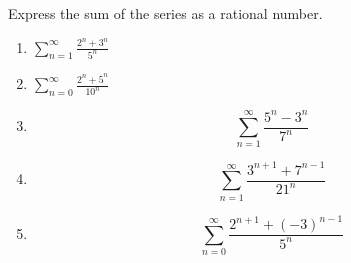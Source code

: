 Express the sum of the series as a rational number.
\begin{multicols}{2}
\begin{enumerate}[ref={\fcProblemRef}]
\item 
\label{problemSum(2^n+3^n)/(5^n)}
$
\displaystyle \sum\limits_{n=1}^{\infty} \frac{2^n+3^n}{5^n}
$


\item \label{problemsumn=0^infty(2^n+5^n)/10^n}
$\displaystyle\sum_{n=0}^{\infty} \frac{2^n+5^n}{10^n}$

\item \label{problemSum(3^n+5^n)/(7^n)}
\[
\sum\limits_{n=1}^{\infty} \frac{5^n-3^n}{7^n}
\]

\item \label{sum_n=1^infty(3^(n+1)+7^(n-1))/21^n}
\[
\sum_{n=1}^\infty \frac{3^{n+1}+7^{n-1}}{21^n}
\]
\item \label{sum_n=0^infty(2^(n+1)+(-3)^(n-1))/5^n}
\[
\sum_{n=0}^\infty \frac{2^{n+1}+(-3)^{n-1}}{5^n}
\]
\end{enumerate}
\end{multicols}